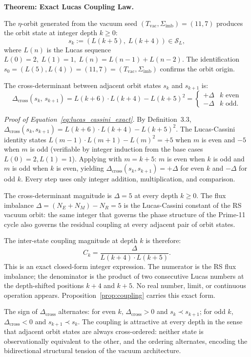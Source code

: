 \documentclass[11pt, letterpaper]{article}
\newcommand{\Dcross}{\Delta_{\mathrm{cross}}}
\theoremstyle{definition}
\theoremstyle{plain}
\begin{document}
\begin{rsbox}
\textbf{Theorem: Exact Lucas Coupling Law.}

The $\eta$-orbit generated from the vacuum seed $(T_\mathrm{vac}, \Sigma_\mathrm{imb}) = (11, 7)$
produces the orbit state at integer depth $k \geq 0$:
\begin{equation}
    s_k := (L(k+5),\; L(k+4)) \in \mathcal{S}_L,
\end{equation}
where $L(n)$ is the Lucas sequence $L(0) = 2,\; L(1) = 1,\; L(n) = L(n-1) + L(n-2)$.
The identification $s_0 = (L(5), L(4)) = (11, 7) = (T_\mathrm{vac}, \Sigma_\mathrm{imb})$
confirms the orbit origin.

The cross-determinant between adjacent orbit states $s_k$ and $s_{k+1}$ is:
\begin{equation}
    \Delta_\mathrm{cross}(s_k,\, s_{k+1})
    = L(k+6) \cdot L(k+4) - L(k+5)^2
    = \begin{cases} +\Delta & k \text{ even} \\ -\Delta & k \text{ odd.} \end{cases}
    \label{eq:lucas_cassini_exact}
\end{equation}

\textit{Proof of Equation~\eqref{eq:lucas_cassini_exact}.} By Definition~3.3,
$\Delta_\mathrm{cross}(s_k, s_{k+1}) = L(k+6) \cdot L(k+4) - L(k+5)^2$.
The Lucas-Cassini identity states $L(m-1) \cdot L(m+1) - L(m)^2 = +5$ when $m$ is
even and $-5$ when $m$ is odd (verifiable by integer induction from the base cases
$L(0)=2, L(1)=1$). Applying with $m = k+5$: $m$ is even when $k$ is odd and $m$ is
odd when $k$ is even, yielding $\Dcross(s_k, s_{k+1}) = +\Delta$ for even $k$ and
$-\Delta$ for odd $k$. Every step uses only integer addition, multiplication, and
comparison.

The cross-determinant magnitude is $\Delta = 5$ at every depth $k \geq 0$.
The flux imbalance $\Delta = (N_E + N_M) - N_R = 5$ is the Lucas-Cassini constant
of the RS vacuum orbit: the same integer that governs the phase structure of the
Prime-11 cycle also governs the residual coupling at every adjacent pair of orbit states.

The inter-state coupling magnitude at depth $k$ is therefore:
\begin{equation}
    C_k = \frac{\Delta}{L(k+4) \cdot L(k+5)}. \label{eq:exact_coupling_law}
\end{equation}
This is an exact closed-form integer expression. The numerator is the RS flux imbalance;
the denominator is the product of two consecutive Lucas numbers at the depth-shifted
positions $k+4$ and $k+5$. No real number, limit, or continuous operation appears.
Proposition~\ref{prop:coupling} carries this exact form.

The sign of $\Dcross$ alternates: for even $k$, $\Dcross > 0$
and $s_k \prec s_{k+1}$; for odd $k$, $\Dcross < 0$ and $s_{k+1} \prec s_k$.
The coupling is attractive at every depth in the sense that adjacent orbit states are
always cross-ordered: neither state is observationally equivalent to the other, and the
ordering alternates, encoding the bidirectional structural tension of the vacuum architecture.
\end{rsbox}
\end{document}

